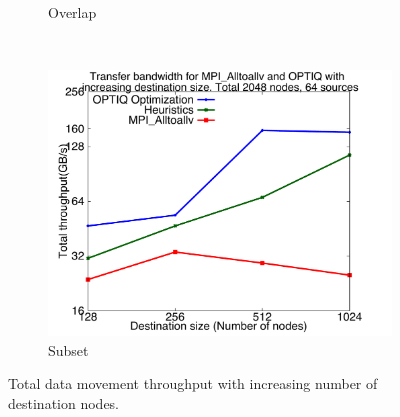 \begin{figure}
\begin{subfigure}[b]{0.32\textwidth}
                \caption{Overlap}
                \label{fig:incrsize_overlap}
        \end{subfigure}
        ~ %
        \begin{subfigure}[b]{0.32\textwidth}
                \includegraphics[width=\textwidth]{figures/incrsize_subset}
                \caption{Subset}
                \label{fig:incrsize_subset}
        \end{subfigure}
        \caption{\small Total data movement throughput with increasing number of destination nodes.}
	\vspace{-0.15in}
        \label{fig:incrsize}
\end{figure}

